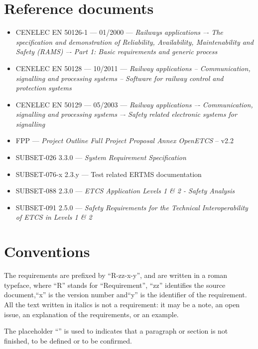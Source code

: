 \documentclass{template/openetcs_article}
\begin{document}
\section{Reference documents}
\begin{itemize}
\item CENELEC EN 50126-1 --- 01/2000 --- \emph{Railways applications –- The specification and 
demonstration of Reliability, Availability, Maintenability and Safety (RAMS) –- Part 1: 
Basic requirements and generic process}
\item CENELEC EN 50128 --- 10/2011 --- \emph{Railway applications -- Communication, signalling and 
processing systems -- Software for railway control and protection systems}
\item CENELEC EN 50129 --- 05/2003 --- \emph{Railway applications –- Communication, signalling and 
processing systems –- Safety related electronic systems for signalling}
\item FPP --- \emph{Project Outline Full Project Proposal Annex OpenETCS} -- v2.2
\item SUBSET-026 3.3.0 --- \emph{System Requirement Specification}
\item SUBSET-076-x 2.3.y --- Test related ERTMS documentation
\item SUBSET-088 2.3.0 --- \emph{ETCS Application Levels 1 \& 2 - Safety Analysis}
\item SUBSET-091 2.5.0 --- \emph{Safety Requirements for the Technical Interoperability
of ETCS in Levels 1 \& 2}
\end{itemize}

\section{Conventions}
The requirements are prefixed by “R-zz-x-y”, and are written in a roman typeface, where ``R'' 
stands for ``Requirement'', ``zz'' identifies the source document,``x'' 
is the version number and``y'' is the identifier of the requirement. All the text 
written in italics is not a requirement: it may be a note, an open issue, an 
explanation of the requirements, or an example.

The placeholder “” is used to indicates that a paragraph or section is not finished, 
to be defined or to be confirmed.
\end{document}
